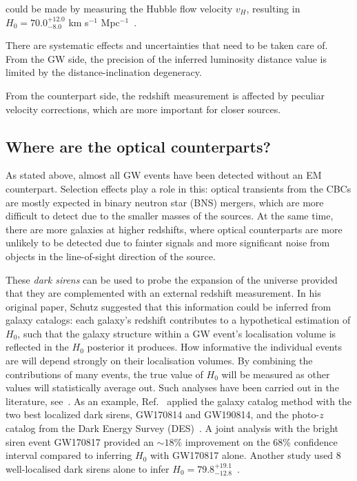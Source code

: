 \documentclass[%
preprint,
nofootinbib,
 amsmath,amssymb,
 aps,
]{revtex4-2}
\begin{document}
could be made by measuring the Hubble flow velocity $v_H$, resulting in $H_0 = 70.0^{+12.0}_{-8.0}$
km s$^{-1}$ Mpc$^{-1}$~\cite{LIGOScientific:2017adf}.

There are systematic effects and uncertainties that need to be taken care of. From the GW side, the
precision of the inferred luminosity distance value is limited by the distance-inclination
degeneracy.

From the counterpart side, the redshift measurement is affected by peculiar velocity corrections,
which are more important for closer sources.

\subsection{Where are the optical counterparts?}

As stated above, almost all GW events have been detected without an EM counterpart. Selection
effects play a role in this: optical transients from the CBCs are mostly expected in binary neutron
star (BNS) mergers, which are more difficult to detect due to the smaller masses of the sources. At
the same time, there are more galaxies at higher redshifts, where optical counterparts are more
unlikely to be detected due to fainter signals and more significant noise from objects in the
line-of-sight direction of the source.

These \textit{dark sirens} can be used to probe the expansion of the universe provided that they
are complemented with an external redshift measurement. In his original paper, Schutz suggested
that this information could be inferred from galaxy catalogs: each galaxy's redshift contributes to
a hypothetical estimation of $H_0$, such that the galaxy structure within a GW event's localisation
volume is reflected in the $H_0$ posterior it produces. How informative the individual events are
will depend strongly on their localisation volumes. By combining the contributions of many events,
the true value of $H_0$ will be measured as other values will statistically average out. Such
analyses have been carried out in the literature,
see~\cite{DelPozzo:2011vcw,Chen:2017rfc,LIGOScientific:2018gmd,Gray:2019ksv,DES:2019ccw}. As an
example, Ref.~ applied the galaxy catalog method with the two best
localized dark sirens, GW170814 and GW190814, and the photo-$z$ catalog from the Dark Energy Survey
(DES)~\cite{thedarkenergysurveycollaboration2005dark}. A joint analysis with the bright siren event
GW170817 provided an $\sim 18\%$ improvement on the 68\% confidence interval compared to inferring
$H_0$ with GW170817 alone. Another study used 8 well-localised dark sirens alone to infer $H_0 =
	79.8^{+19.1}_{-12.8}$~\cite{Palmese_2023}.
\end{document}
